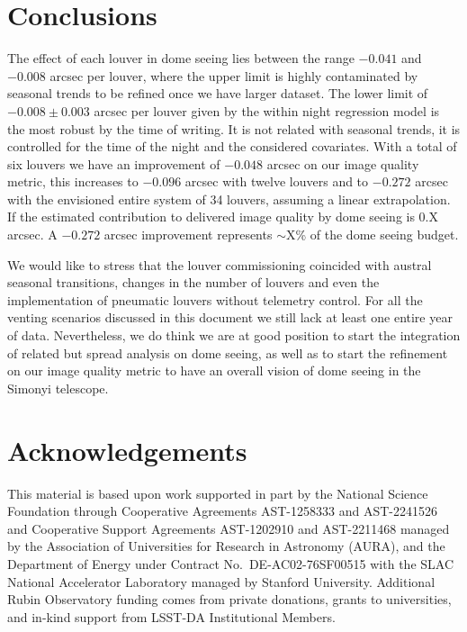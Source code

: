 \documentclass[TS,lsstdraft,authoryear,toc]{lsstdoc}
\begin{document}
\section{Conclusions}
The effect of each louver in dome seeing lies between the range $-0.041$ and $-0.008$ arcsec per louver, where the upper limit is highly contaminated by seasonal trends to be refined once we have larger dataset. The lower limit of $-0.008\pm0.003$ arcsec per louver given by the within night regression model is the most robust by the time of writing. It is not related with seasonal trends, it is controlled for the time of the night and the considered covariates. With a total of six louvers we have an improvement of $-0.048$ arcsec on our image quality metric, this increases to $-0.096$ arcsec with twelve louvers and to $-0.272$ arcsec with the envisioned entire system of 34 louvers, assuming a linear extrapolation. If the estimated contribution to delivered image quality by dome seeing is 0.X arcsec. A $-0.272$ arcsec improvement represents $\sim$X\% of the dome seeing budget.

We would like to stress that the louver commissioning coincided with austral seasonal transitions, changes in the number of louvers and even the implementation of pneumatic louvers without telemetry control. For all the venting scenarios discussed in this document we still lack at least one entire year of data. Nevertheless, we do think we are at good position to start the integration of related but spread analysis on dome seeing, as well as to start the refinement on our image quality metric to have an overall vision of dome seeing in the Simonyi telescope.  


\appendix

\section{Acknowledgements}

This material is based upon work supported in part by the National Science Foundation through Cooperative Agreements AST-1258333 and AST-2241526 and Cooperative Support Agreements AST-1202910 and AST-2211468 managed by the Association of Universities for Research in Astronomy (AURA), and the Department of Energy under Contract No.\ DE-AC02-76SF00515 with the SLAC National Accelerator Laboratory managed by Stanford University. Additional Rubin Observatory funding comes from private donations, grants to universities, and in-kind support from LSST-DA Institutional Members.
\end{document}
